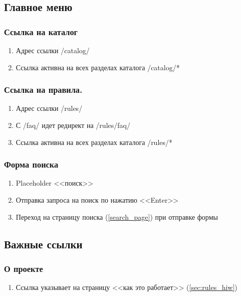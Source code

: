         \subsection{Главное меню}
            \label{sec:baseitems_main_meu}
            \subsubsection{Ссылка на каталог}
                \begin{enumerate}
                    \item Адрес ссылки /catalog/
                    \item Ссылка активна на всех разделах каталога /catalog/*
                \end{enumerate}
            \subsubsection{Ссылка на правила.}
                \begin{enumerate}
                    \item Адрес ссылки /rules/
                    \item С /faq/ идет редирект на /rules/faq/
                    \item Ссылка активна на всех разделах каталога /rules/*
                \end{enumerate}
            
            \subsubsection{Форма поиска}
                \begin{enumerate}
                    \item Placeholder <<поиск>>
                    \item Отправка запроса на поиск по нажатию <<Enter>>
                    \item Переход на страницу поиска (\ref{search_page}) при отправке формы
                \end{enumerate}
        \subsection{Важные ссылки}
            \label{sec:baseitems_important_links}
            \subsubsection{О проекте}
                \begin{enumerate}
                    \item Ссылка указывает на страницу <<как это работает>> (\ref{sec:rules_hiw})
                \end{enumerate}
